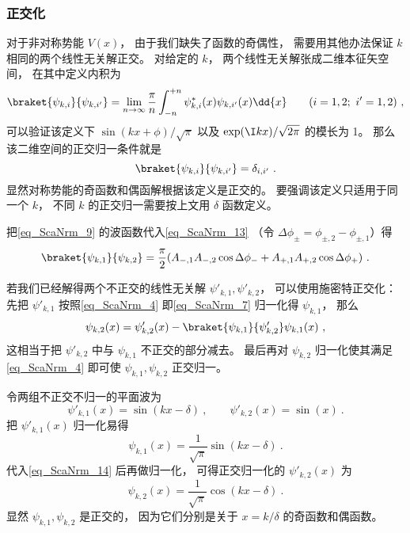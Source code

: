 \subsubsection{正交化}
对于非对称势能 $V(x)$， 由于我们缺失了函数的奇偶性， 需要用其他办法保证 $k$ 相同的两个线性无关解正交。 对给定的 $k$， 两个线性无关解张成二维本征矢空间， 在其中定义内积为
\begin{equation}\label{eq_ScaNrm_13}
\braket{\psi_{k,i}}{\psi_{k,i'}} = \lim_{n\to\infty}\frac{\pi}{n}\int_{-n}^{+n} \psi_{k,i}^*(x) \psi_{k,i'}(x) \dd{x} \qquad (i = 1,2;\ i' = 1,2)~,
\end{equation}
可以验证该定义下 $\sin(kx+\phi)/\sqrt{\pi}$ 以及 $\exp(\I kx)/\sqrt{2\pi}$ 的模长为 1。 那么该二维空间的正交归一条件就是
\begin{equation}\label{eq_ScaNrm_7}
\braket{\psi_{k,i}}{\psi_{k,i'}} = \delta_{i,i'}~.
\end{equation}
显然对称势能的奇函数和偶函解根据该定义是正交的。 要强调该定义只适用于同一个 $k$， 不同 $k$ 的正交归一需要按上文用 $\delta$ 函数定义。

把\autoref{eq_ScaNrm_9} 的波函数代入\autoref{eq_ScaNrm_13} （令 $\Delta\phi_\pm = \phi_{\pm, 2} - \phi_{\pm, 1}$）得
\begin{equation}
\braket{\psi_{k,1}}{\psi_{k,2}} = \frac{\pi}{2}(A_{-,1}A_{-,2}\cos\Delta\phi_- + A_{+,1}A_{+,2}\cos\Delta\phi_+)~.
\end{equation}


若我们已经解得两个不正交的线性无关解 $\psi'_{k,1}, \psi'_{k,2}$， 可以使用施密特正交化： 先把 $\psi'_{k,1}$ 按照\autoref{eq_ScaNrm_4} 即\autoref{eq_ScaNrm_7} 归一化得 $\psi_{k,1}$， 那么
\begin{equation}\label{eq_ScaNrm_14}
\psi_{k,2}(x) = \psi_{k,2}'(x) - \braket{\psi_{k,1}}{\psi'_{k,2}} \psi_{k,1}(x)~,
\end{equation}
这相当于把 $\psi'_{k,2}$ 中与 $\psi_{k,1}$ 不正交的部分减去。 最后再对 $\psi_{k,2}$ 归一化使其满足\autoref{eq_ScaNrm_4} 即可使 $\psi_{k,1}, \psi_{k,2}$ 正交归一。

\begin{example}{}
令两组不正交不归一的平面波为
\begin{equation}
\psi'_{k,1}(x) = \sin(kx - \delta)~, \qquad
\psi'_{k,2}(x) = \sin(x)~.
\end{equation}
把 $\psi'_{k,1}(x)$ 归一化易得
\begin{equation}
\psi_{k,1}(x) = \frac{1}{\sqrt{\pi}}\sin(kx - \delta)~.
\end{equation}
代入\autoref{eq_ScaNrm_14} 后再做归一化， 可得正交归一化的 $\psi'_{k,2}(x)$ 为
\begin{equation}
\psi_{k,2}(x) = \frac{1}{\sqrt{\pi}}\cos(kx - \delta)~.
\end{equation}
显然 $\psi_{k,1}, \psi_{k,2}$ 是正交的， 因为它们分别是关于 $x = k/\delta$ 的奇函数和偶函数。
\end{example}

